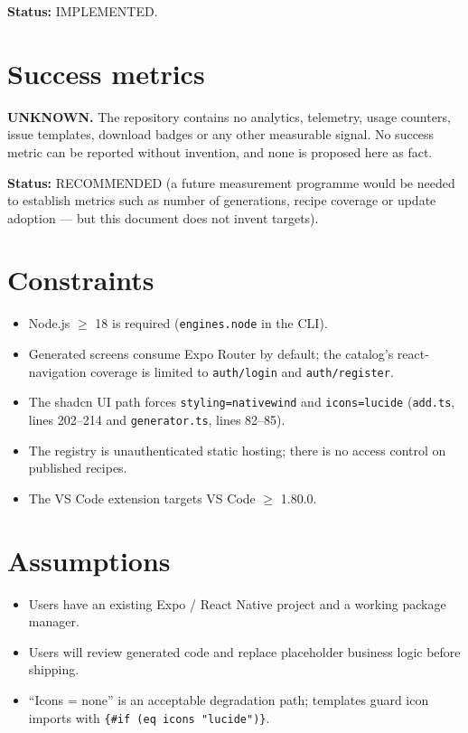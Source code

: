 \textbf{Status:} IMPLEMENTED.

\section{Success metrics}

\textbf{UNKNOWN.} The repository contains no analytics, telemetry, usage counters,
issue templates, download badges or any other measurable signal. No success
metric can be reported without invention, and none is proposed here as fact.

\textbf{Status:} RECOMMENDED (a future measurement programme would be needed to
establish metrics such as number of generations, recipe coverage or update
adoption --- but this document does not invent targets).

\section{Constraints}

\begin{itemize}
  \item Node.js $\geq$ 18 is required (\texttt{engines.node} in the CLI).
  \item Generated screens consume Expo Router by default; the catalog's
        react-navigation coverage is limited to \texttt{auth/login} and
        \texttt{auth/register}.
  \item The shadcn UI path forces \texttt{styling=nativewind} and
        \texttt{icons=lucide} (\texttt{add.ts}, lines 202--214 and
        \texttt{generator.ts}, lines 82--85).
  \item The registry is unauthenticated static hosting; there is no access
        control on published recipes.
  \item The VS Code extension targets VS Code $\geq$ 1.80.0.
\end{itemize}

\section{Assumptions}

\begin{itemize}
  \item Users have an existing Expo / React Native project and a working package
        manager.
  \item Users will review generated code and replace placeholder business logic
        before shipping.
  \item ``Icons = none'' is an acceptable degradation path; templates guard icon
        imports with \texttt{\{\#if (eq icons "lucide")\}}.
\end{itemize}

